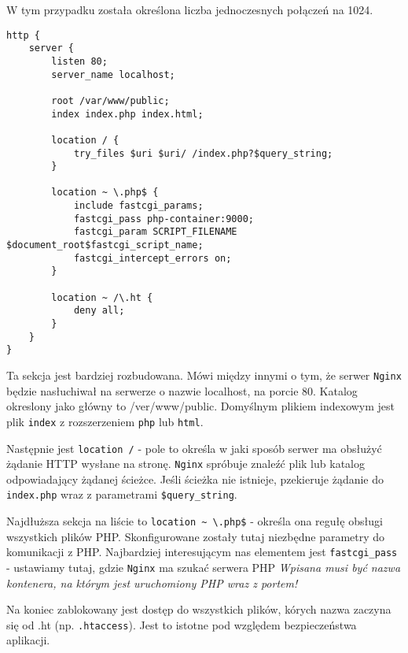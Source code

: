 W tym przypadku została określona liczba jednoczesnych połączeń na 1024.

\newpage
\begin{lstlisting}[style=nginx, caption={Plik konfiguracyjny nginx.conf - sekcja http}, label={lst:nginx_config_http}]
http {
    server {
        listen 80;
        server_name localhost;

        root /var/www/public;
        index index.php index.html;

        location / {
            try_files $uri $uri/ /index.php?$query_string;
        }

        location ~ \.php$ {
            include fastcgi_params;
            fastcgi_pass php-container:9000;
            fastcgi_param SCRIPT_FILENAME $document_root$fastcgi_script_name;
            fastcgi_intercept_errors on;
        }

        location ~ /\.ht {
            deny all;
        }
    }
}
\end{lstlisting}

Ta sekcja jest bardziej rozbudowana. Mówi między innymi o tym, że serwer \verb|Nginx| będzie nasłuchiwał na serwerze o nazwie localhost, na porcie 80. Katalog okreslony jako główny to /ver/www/public. Domyślnym plikiem indexowym jest plik \verb|index| z rozszerzeniem \verb|php| lub \verb|html|.

Następnie jest \verb|location /| - pole to określa w jaki sposób serwer ma obsłużyć żądanie HTTP wysłane na stronę. \verb|Nginx| spróbuje znaleźć plik lub katalog odpowiadający żądanej ścieżce. Jeśli ścieżka nie istnieje, pzekieruje żądanie do \verb|index.php| wraz z parametrami \verb|$query_string|.

Najdłuższa sekcja na liście to \verb|location ~ \.php$| - określa ona regułę obsługi wszystkich plików PHP. Skonfigurowane zostały tutaj niezbędne parametry do komunikacji z PHP. Najbardziej interesującym nas elementem jest \verb|fastcgi_pass| - ustawiamy tutaj, gdzie \verb|Nginx| ma szukać serwera PHP
\textit{Wpisana musi być nazwa kontenera, na którym jest uruchomiony PHP wraz z portem!}

Na koniec zablokowany jest dostęp do wszystkich plików, kórych nazwa zaczyna się od .ht (np. \verb|.htaccess|). Jest to istotne pod względem bezpieczeństwa aplikacji.